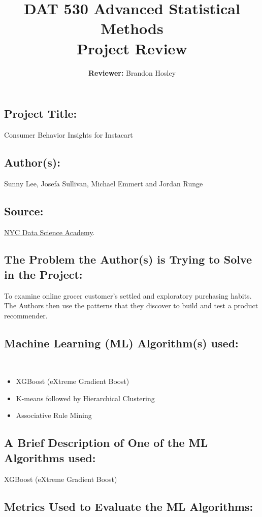 \documentclass[]{article}
\title{\textbf{DAT 530 Advanced Statistical Methods}\\
	\normalsize{Project Review} }
\author{\textbf{Reviewer: }
	Brandon Hosley}
\begin{document}
\setlength{\droptitle}{-10em} 
\pretitle{\begin{flushleft}\LARGE} %
	\posttitle{\end{flushleft}}
\preauthor{\begin{flushleft}\large} %
	\postauthor{\end{flushleft}}
\predate{\begin{flushleft}\large} %
	\postdate{\end{flushleft}}
\maketitle

\vspace{-2em}

\subsection*{Project Title:}
Consumer Behavior Insights for Instacart

\subsection*{Author(s):}
Sunny Lee, Josefa Sullivan, Michael Emmert and Jordan Runge

\subsection*{Source:}
\href{https://nycdatascience.com/blog/student-works/recommendations-for-online-groceries/}{NYC Data Science Academy}.

\subsection*{The Problem the Author(s) is Trying to Solve in the Project:}
To examine online grocer customer's settled and exploratory purchasing habits. \\
The Authors then use the patterns that they discover to build and test a product recommender.
 
\subsection*{Machine Learning (ML) Algorithm(s) used:}\\
\begin{itemize}
	\item XGBoost (eXtreme Gradient Boost)
	\item K-means followed by Hierarchical Clustering
	\item Associative Rule Mining
\end{itemize}

\subsection*{A Brief Description of One of the ML Algorithms used:}
 XGBoost (eXtreme Gradient Boost)

\subsection*{Metrics Used to Evaluate the ML Algorithms:}
\end{document}
